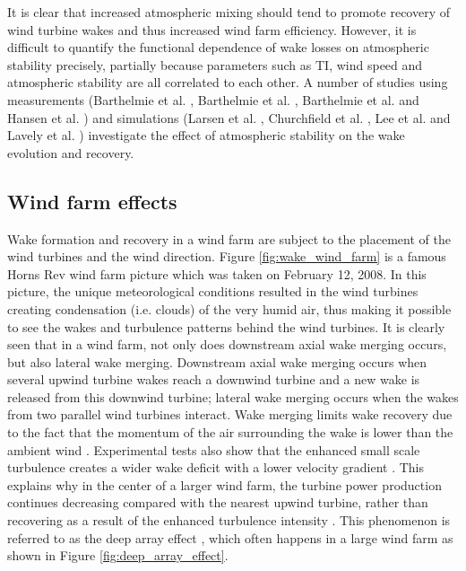 \documentclass{umthesis}
\begin{document}
It is clear that increased atmospheric mixing should tend to promote recovery of wind turbine wakes and thus increased wind farm efficiency. However, it is difficult to quantify the functional dependence of wake losses on atmospheric stability precisely, partially because parameters such as TI, wind speed and atmospheric stability are all correlated to each other. A number of studies using measurements (Barthelmie et al. \cite{barthelmie_modelling_2009}, Barthelmie et al. \cite{Barthelmie_wakes_2009}, Barthelmie et al. \cite{Ten_years} and Hansen et al. \cite{hansen_impact_2012}) and simulations (Larsen et al. \cite{Larsen_2009}, Churchfield et al. \cite{Churchfield_2012}, Lee et al. \cite{Lee_2014} and Lavely et al. \cite{Lavely_2011}) investigate the effect of atmospheric stability on the wake evolution and recovery.


\subsection{Wind farm effects}
Wake formation and recovery in a wind farm are subject to the placement of the wind turbines and the wind direction. Figure \ref{fig:wake_wind_farm} is a famous Horns Rev wind farm picture which was taken on February 12, 2008. In this picture, the unique meteorological conditions resulted in the wind turbines creating condensation (i.e. clouds) of the very humid air, thus making it possible to see the wakes and turbulence patterns behind the wind turbines. It is clearly seen that in a wind farm, not only does downstream axial wake merging occurs, but also lateral wake merging. Downstream axial wake merging occurs when several upwind turbine wakes reach a downwind turbine and a new wake is released from this downwind turbine; lateral wake merging occurs when the wakes from two parallel wind turbines interact. Wake merging limits wake recovery due to the fact that the momentum of the air surrounding the wake is lower than the ambient wind \cite{Barthelmie_2011_Meteorological}. Experimental tests also show that the enhanced small scale turbulence creates a wider wake deficit with a lower velocity gradient \cite{Barthelmie_2011_Meteorological, Méchali}. This explains why in the center of a larger wind farm, the turbine power production continues decreasing compared with the nearest upwind turbine, rather than recovering as a result of the enhanced turbulence intensity \cite{Hao}. This phenomenon is referred to as the deep array effect \cite{Andersen_2011, Barthelmie_Evaluation, Calaf_2010, Frandsen_2007, meyers_optimal_2012, Schlez_2009, Smith_2011}, which often happens in a large wind farm as shown in Figure \ref{fig:deep_array_effect}.
\end{document}
